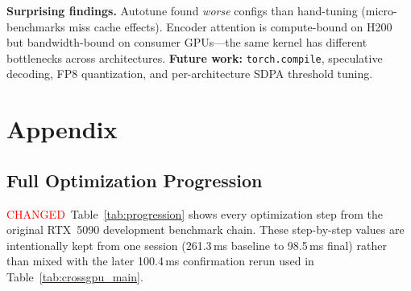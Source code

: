 \documentclass{article}
\newcommand{\chg}[1]{{\color{blue}#1}}
\newcommand{\chglabel}{{\setlength{\fboxsep}{1pt}\colorbox{yellow!45}{\textcolor{red}{\scriptsize CHANGED}}}}
\begin{document}
\textbf{Surprising findings.}
Autotune found \emph{worse} configs than hand-tuning (micro-benchmarks miss cache effects). Encoder attention is compute-bound on H200 but bandwidth-bound on consumer GPUs---the same kernel has different bottlenecks across architectures.
\textbf{Future work:} \texttt{torch.compile}, speculative decoding, FP8 quantization, and per-architecture SDPA threshold tuning.

\clearpage



\appendix
\section{Appendix}

\subsection{Full Optimization Progression}

\chglabel\ \chg{Table~\ref{tab:progression} shows every optimization step from the original RTX~5090 development benchmark chain.  These step-by-step values are intentionally kept from one session (261.3\,ms baseline to 98.5\,ms final) rather than mixed with the later 100.4\,ms confirmation rerun used in Table~\ref{tab:crossgpu_main}.}
\end{document}
